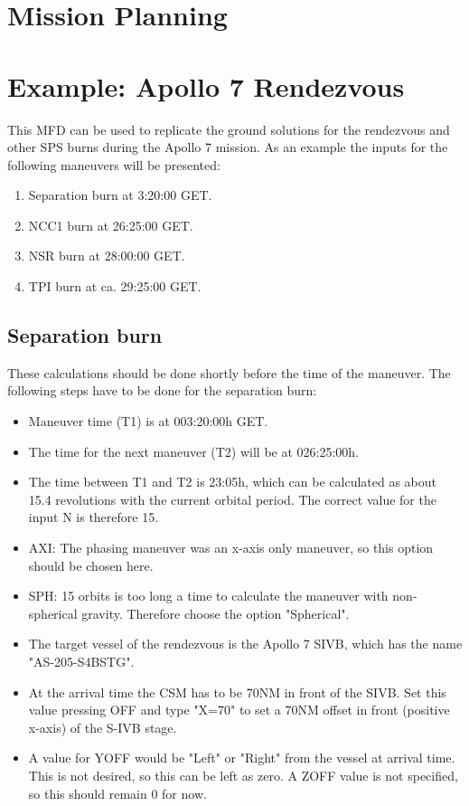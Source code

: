 \documentclass[11pt]{article} %
\begin{document}
\section{Mission Planning}

\section{Example: Apollo 7 Rendezvous}

This MFD can be used to replicate the ground solutions for the rendezvous and other SPS burns during the Apollo 7 mission. As an example the inputs for the following maneuvers will be presented:

\begin{enumerate}
	\item {Separation burn at 3:20:00 GET.}
	\item {NCC1 burn at 26:25:00 GET.}
	\item {NSR burn at 28:00:00 GET.}
	\item {TPI burn at ca. 29:25:00 GET.}
\end{enumerate}

\subsection{Separation burn}

These calculations should be done shortly before the time of the maneuver. The following steps have to be done for the separation burn:

\begin{itemize}
	\item{Maneuver time (T1) is at 003:20:00h GET.}
	\item{The time for the next maneuver (T2) will be at 026:25:00h.}
	\item{The time between T1 and T2 is 23:05h, which can be calculated as about 15.4 revolutions with the current orbital period. The correct value for the input N is therefore 15.}
	\item{AXI: The phasing maneuver was an x-axis only maneuver, so this option should be chosen here.}
	\item{SPH: 15 orbits is too long a time to calculate the maneuver with non-spherical gravity. Therefore choose the option "Spherical".}
	\item{The target vessel of the rendezvous is the Apollo 7 SIVB, which has the name "AS-205-S4BSTG".}
	\item{At the arrival time the CSM has to be 70NM in front of the SIVB. Set this value pressing OFF and type "X=70" to set a 70NM offset in front (positive x-axis) of the S-IVB stage. }
	\item{A value for YOFF would be "Left" or "Right" from the vessel at arrival time. This is not desired, so this can be left as zero. A ZOFF value is not specified, so this should remain 0 for now.}
\end{itemize}
\end{document}
